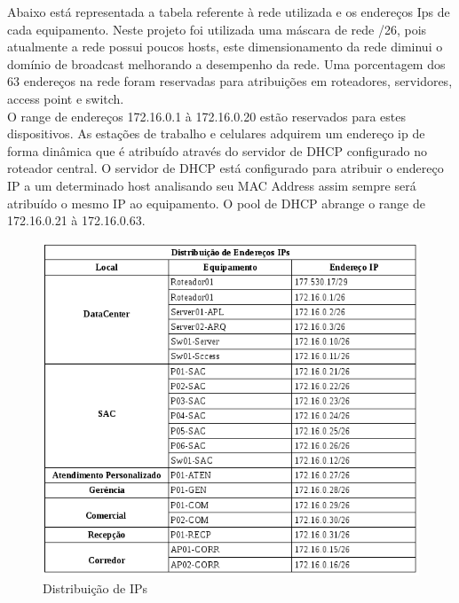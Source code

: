 \documentclass[	DIV=calc,%
							paper=a4,%
							fontsize=12pt,%
							onecolumn]{scrartcl}	 					%
\begin{document}
Abaixo está representada a tabela referente à rede utilizada e os endereços Ips de cada equipamento. Neste projeto foi utilizada uma máscara de rede /26, pois atualmente a rede possui poucos hosts, este dimensionamento da rede diminui o domínio de broadcast melhorando a desempenho da rede. Uma porcentagem dos 63 endereços na rede foram reservadas para atribuições em roteadores, servidores, access point e switch.
\\

O range de endereços 172.16.0.1 à 172.16.0.20 estão reservados para estes dispositivos. As estações de trabalho e celulares adquirem um endereço ip de forma dinâmica que é atribuído através do servidor de DHCP configurado no roteador central. O servidor de DHCP está configurado para atribuir o endereço IP a um determinado host analisando seu MAC Address assim sempre será atribuído o mesmo IP ao equipamento. O pool de DHCP abrange o range de 172.16.0.21 à 172.16.0.63.

\begin{figure}
	\centering
	\includegraphics[height=\textwidth]{enderecos-ips}
	\caption{Distribuição de IPs}
	\label{enderecos-ips}
\end{figure}
\end{document}
